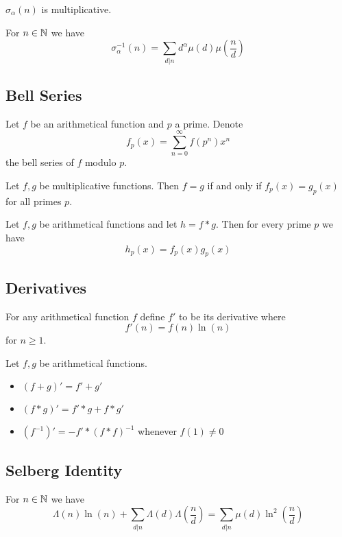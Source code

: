 \documentclass[a4paper]{article}
\begin{document}
\begin{prp} $\sigma_\alpha(n)$ is multiplicative. 
\end{prp}

\begin{thm} For $n\in\mathbb{N}$ we have $$\sigma_\alpha^{-1}(n)=\sum_{d|n}d^\alpha\mu(d)\mu\left(\frac{n}{d}\right)$$
\end{thm}

\subsection{Bell Series}
\begin{defn} Let $f$ be an arithmetical function and $p$ a prime. Denote $$f_p(x)=\sum_{n=0}^\infty f(p^n)x^n$$ the bell series of $f$ modulo $p$. 
\end{defn}

\begin{thm} Let $f,g$ be multiplicative functions. Then $f=g$ if and only if $f_p(x)=g_p(x)$ for all primes $p$. 
\end{thm}

\begin{thm} Let $f,g$ be arithmetical functions and let $h=f\ast g$. Then for every prime $p$ we have $$h_p(x)=f_p(x)g_p(x)$$
\end{thm}

\subsection{Derivatives}
\begin{defn} For any arithmetical function $f$ define $f'$ to be its derivative where $$f'(n)=f(n)\ln(n)$$ for $n\geq 1$. 
\end{defn}

\begin{thm} Let $f,g$ be arithmetical functions. 
\begin{itemize}
\item $(f+g)'=f'+g'$
\item $(f\ast g)'=f'\ast g+f\ast g'$
\item $(f^{-1})'=-f'\ast(f\ast f)^{-1}$ whenever $f(1)\neq0$
\end{itemize}
\end{thm}

\subsection{Selberg Identity}
\begin{thm} For $n\in\mathbb{N}$ we have $$\Lambda(n)\ln(n)+\sum_{d|n}\Lambda(d)\Lambda\left(\frac{n}{d}\right)=\sum_{d|n}\mu(d)\ln^2\left(\frac{n}{d}\right)$$
\end{thm}
\end{document}
